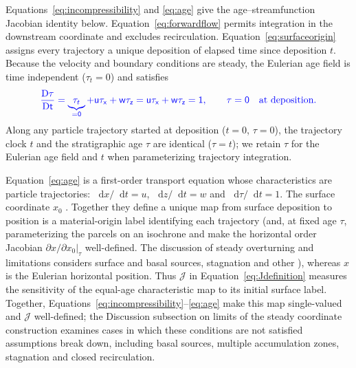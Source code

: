 \documentclass[review]{igs}
\providecommand{\DIFadd}[1]{{\protect\color{blue} \sf #1}} %
\providecommand{\DIFdel}[1]{{\protect\color{red} \scriptsize #1}} %
\providecommand{\DIFaddbegin}{} %
\providecommand{\DIFaddend}{} %
\providecommand{\DIFdelbegin}{} %
\providecommand{\DIFdelend}{} %
\newcommand{\DIFscaledelfig}{0.5}
\newlength{\DIFdelgraphicswidth} %
\newlength{\DIFdelgraphicsheight} %
\newcommand{\DIFaddincludegraphics}[2][]{{\color{blue}\fbox{\DIFOincludegraphics[#1]{#2}}}} %
\newcommand{\DIFdelincludegraphics}[2][]{%
\sbox{\DIFdelgraphicsbox}{\DIFOincludegraphics[#1]{#2}}%
\settoboxwidth{\DIFdelgraphicswidth}{\DIFdelgraphicsbox} %
\settoboxtotalheight{\DIFdelgraphicsheight}{\DIFdelgraphicsbox} %
\scalebox{\DIFscaledelfig}{%
\parbox[b]{\DIFdelgraphicswidth}{\usebox{\DIFdelgraphicsbox}\\[-\baselineskip] \rule{\DIFdelgraphicswidth}{0em}}\llap{\resizebox{\DIFdelgraphicswidth}{\DIFdelgraphicsheight}{%
\setlength{\unitlength}{\DIFdelgraphicswidth}%
\begin{picture}(1,1)%
\thicklines\linethickness{2pt} %
{\color[rgb]{1,0,0}\put(0,0){\framebox(1,1){}}}%
{\color[rgb]{1,0,0}\put(0,0){\line( 1,1){1}}}%
{\color[rgb]{1,0,0}\put(0,1){\line(1,-1){1}}}%
\end{picture}%
}\hspace*{3pt}}} %
} %
\DeclareRobustCommand{\DIFaddbegin}{\DIFOaddbegin \let\includegraphics\DIFaddincludegraphics} %
\DeclareRobustCommand{\DIFaddend}{\DIFOaddend \let\includegraphics\DIFOincludegraphics} %
\DeclareRobustCommand{\DIFdelbegin}{\DIFOdelbegin \let\includegraphics\DIFdelincludegraphics} %
\DeclareRobustCommand{\DIFdelend}{\DIFOaddend \let\includegraphics\DIFOincludegraphics} %
\begin{document}
\DIFdel{Equations~\ref{eq:incompressibility} and \ref{eq:age} give the age--streamfunction Jacobian identity below. Equation~\ref{eq:forwardflow} permits integration in the downstream coordinate and excludes recirculation.
Equation~\ref{eq:surfaceorigin} assigns every trajectory a unique deposition }\DIFdelend \DIFaddbegin \DIFadd{of elapsed time since deposition \(t\). Because the velocity and boundary conditions are steady, the Eulerian age field is time independent (\(\tau_t=0\)) and satisfies
}\begin{equation}
\DIFadd{\frac{\mathrm{D}\tau}{\mathrm{D}t}
=\underbrace{\tau_t}_{=0}+u\tau_x+w\tau_z
=u\tau_x+w\tau_z
=1,
\qquad \tau=0\quad\text{at deposition}.
\label{eq:age}
}\end{equation}
\DIFadd{Along any particle trajectory started at deposition (\(t=0\), \(\tau=0\)), the trajectory clock \(t\) and the stratigraphic age \(\tau\) are identical (\(\tau=t\)); we retain \(\tau\) for the Eulerian age field and \(t\) when parameterizing trajectory integration.
}

\DIFadd{Equation~\ref{eq:age} is a first-order transport equation whose characteristics are particle trajectories: \(\mathop{}\!\mathrm{d}x/\mathop{}\!\mathrm{d}t=u\), \(\mathop{}\!\mathrm{d}z/\mathop{}\!\mathrm{d}t=w\) and \(\mathop{}\!\mathrm{d}\tau/\mathop{}\!\mathrm{d}t=1\). The surface }\DIFaddend coordinate \(x_0\) \DIFdelbegin \DIFdel{. Together they define a unique map from surface deposition to position }\DIFdelend \DIFaddbegin \DIFadd{is a material-origin label identifying each trajectory (and, at fixed age \(\tau\), parameterizing the parcels }\DIFaddend on an isochrone\DIFdelbegin \DIFdel{and make the horizontal order Jacobian \(\left.\partial x/\partial x_0\right|_\tau\) well-defined. The discussion of steady overturning and limitations considers surface and basal sources, stagnation and other }\DIFdelend \DIFaddbegin \DIFadd{), whereas \(x\) is the Eulerian horizontal position. Thus \(\mathcal{J}\) in Equation~\ref{eq:Jdefinition} measures the sensitivity of the equal-age characteristic map to its initial surface label. Together, Equations~\ref{eq:incompressibility}--\ref{eq:age} make this map single-valued and \(\mathcal{J}\) well-defined; the Discussion subsection on limits of the steady coordinate construction examines }\DIFaddend cases in which these \DIFdelbegin \DIFdel{conditions are not satisfied}\DIFdelend \DIFaddbegin \DIFadd{assumptions break down, including basal sources, multiple accumulation zones, stagnation and closed recirculation}\DIFaddend .
\end{document}
